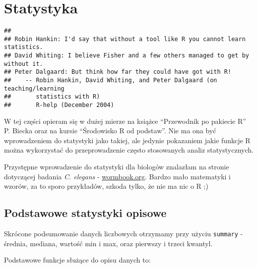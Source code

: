 \documentclass[
]{book}
\begin{document}
\hypertarget{statystyka}{%
\chapter{Statystyka}\label{statystyka}}

\begin{verbatim}
## 
## Robin Hankin: I'd say that without a tool like R you cannot learn statistics.
## David Whiting: I believe Fisher and a few others managed to get by without it.
## Peter Dalgaard: But think how far they could have got with R!
##    -- Robin Hankin, David Whiting, and Peter Dalgaard (on teaching/learning
##       statistics with R)
##       R-help (December 2004)
\end{verbatim}

W tej części opieram się w dużej mierze na książce ``Przewodnik po pakiecie R'' P. Biecka oraz na kursie ``Środowisko R od podstaw''. Nie ma ona być wprowadzeniem do statystyki jako takiej, ale jedynie pokazaniem jakie funkcje R można wykorzystać do przeprowadzenie często stosowanych analiz statystycznych.

Przystępne wprowadzenie do statystyki dla biologów znalazłam na stronie dotyczącej badania \emph{C. elegans} - \href{http://www.wormbook.org/chapters/www_statisticalanalysis/statisticalanalysis.html\#sec1}{wormbook.org}. Bardzo mało matematyki i wzorów, za to sporo przykładów, szkoda tylko, że nie ma nic o R ;)

\hypertarget{podstawowe-statystyki-opisowe}{%
\section{Podstawowe statystyki opisowe}\label{podstawowe-statystyki-opisowe}}

Skrócone podsumowanie danych liczbowych otrzymamy przy użyciu \texttt{summary} - średnia, mediana, wartość min i max, oraz pierwszy i trzeci kwantyl.

Podstawowe funkcje służące do opisu danych to:
\end{document}
